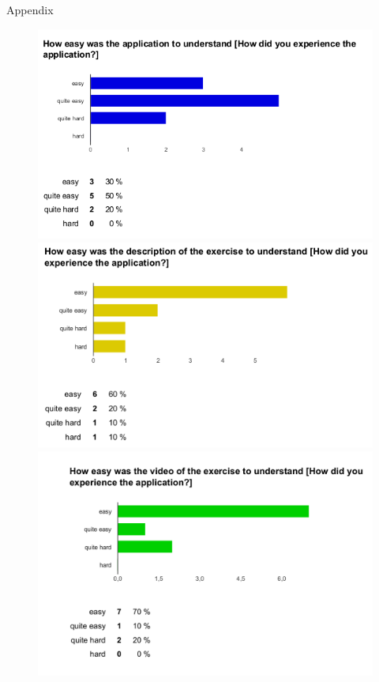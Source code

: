 \begin{LARGE}
Appendix
\end{LARGE}

\begin{figure}[b!]
  \centering
    \begin{minipage}{0.7\textwidth}
      \centering
        \includegraphics[width=1\textwidth]{00_resources/figures/survey_results1.png}
    \end{minipage}
    \begin{minipage}{0.7\textwidth}
      \centering
        \includegraphics[width=1\textwidth]{00_resources/figures/survey_results2.png}
    \end{minipage}
    \begin{minipage}{0.7\textwidth}
      \centering
        \includegraphics[width=1\textwidth]{00_resources/figures/survey_results3.png}

\end{minipage}
\end{figure}
